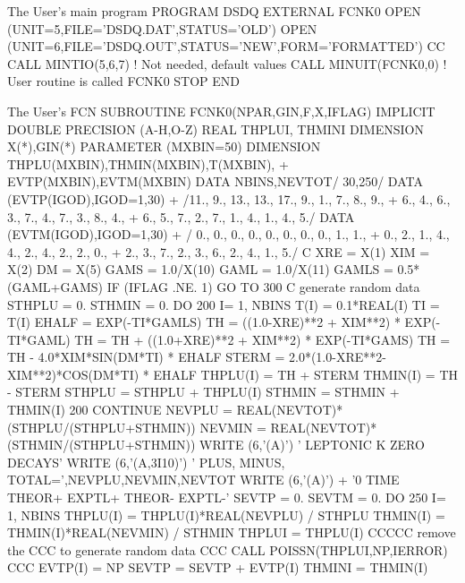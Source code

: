 \begin{XMPt}{The User's main program}
      PROGRAM DSDQ
      EXTERNAL FCNK0
      OPEN (UNIT=5,FILE='DSDQ.DAT',STATUS='OLD')
      OPEN (UNIT=6,FILE='DSDQ.OUT',STATUS='NEW',FORM='FORMATTED')
CC      CALL MINTIO(5,6,7)   ! Not needed, default values
      CALL MINUIT(FCNK0,0)   ! User routine is called FCNK0
      STOP
      END
\end{XMPt}
\medskip
\begin{XMPt}{The User's FCN}
      SUBROUTINE FCNK0(NPAR,GIN,F,X,IFLAG)
      IMPLICIT DOUBLE PRECISION (A-H,O-Z)
      REAL THPLUI, THMINI
      DIMENSION X(*),GIN(*)
      PARAMETER (MXBIN=50)
      DIMENSION THPLU(MXBIN),THMIN(MXBIN),T(MXBIN),
     +    EVTP(MXBIN),EVTM(MXBIN)
      DATA  NBINS,NEVTOT/ 30,250/
      DATA (EVTP(IGOD),IGOD=1,30)
     +         /11.,  9., 13., 13., 17.,  9.,  1.,  7.,  8.,  9.,
     +           6.,  4.,  6.,  3.,  7.,  4.,  7.,  3.,  8.,  4.,
     +           6.,  5.,  7.,  2.,  7.,  1.,  4.,  1.,  4.,  5./
      DATA (EVTM(IGOD),IGOD=1,30)
     +         / 0.,  0.,  0.,  0.,  0.,  0.,  0.,  0.,  1.,  1.,
     +           0.,  2.,  1.,  4.,  4.,  2.,  4.,  2.,  2.,  0.,
     +           2.,  3.,  7.,  2.,  3.,  6.,  2.,  4.,  1.,  5./
C
      XRE = X(1)
      XIM = X(2)
      DM = X(5)
      GAMS = 1.0/X(10)
      GAML = 1.0/X(11)
      GAMLS = 0.5*(GAML+GAMS)
      IF (IFLAG .NE. 1)  GO TO 300
C                        generate random data
      STHPLU = 0.
      STHMIN = 0.
      DO 200 I= 1, NBINS
      T(I) = 0.1*REAL(I)
      TI = T(I)
      EHALF = EXP(-TI*GAMLS)
      TH =      ((1.0-XRE)**2 + XIM**2) * EXP(-TI*GAML)
      TH = TH + ((1.0+XRE)**2 + XIM**2) * EXP(-TI*GAMS)
      TH = TH -               4.0*XIM*SIN(DM*TI) * EHALF
      STERM = 2.0*(1.0-XRE**2-XIM**2)*COS(DM*TI) * EHALF
      THPLU(I) = TH + STERM
      THMIN(I) = TH - STERM
      STHPLU = STHPLU + THPLU(I)
      STHMIN = STHMIN + THMIN(I)
  200 CONTINUE
      NEVPLU = REAL(NEVTOT)*(STHPLU/(STHPLU+STHMIN))
      NEVMIN = REAL(NEVTOT)*(STHMIN/(STHPLU+STHMIN))
      WRITE (6,'(A)') '  LEPTONIC K ZERO DECAYS'
      WRITE (6,'(A,3I10)') ' PLUS, MINUS, TOTAL=',NEVPLU,NEVMIN,NEVTOT
      WRITE (6,'(A)')
     +  '0    TIME        THEOR+      EXPTL+     THEOR-      EXPTL-'
      SEVTP = 0.
      SEVTM = 0.
      DO 250 I= 1, NBINS
      THPLU(I) = THPLU(I)*REAL(NEVPLU) / STHPLU
      THMIN(I) = THMIN(I)*REAL(NEVMIN) / STHMIN
      THPLUI = THPLU(I)
CCCCC       remove the CCC to generate random data
CCC      CALL POISSN(THPLUI,NP,IERROR)
CCC      EVTP(I) = NP
      SEVTP = SEVTP + EVTP(I)
      THMINI = THMIN(I)

\end{XMPt}
